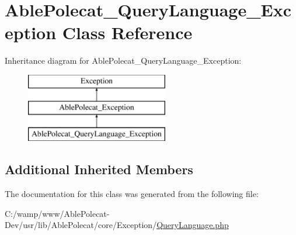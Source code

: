 \hypertarget{class_able_polecat___query_language___exception}{}\section{Able\+Polecat\+\_\+\+Query\+Language\+\_\+\+Exception Class Reference}
\label{class_able_polecat___query_language___exception}
Inheritance diagram for Able\+Polecat\+\_\+\+Query\+Language\+\_\+\+Exception\+:\begin{figure}[H]
\begin{center}
\leavevmode
\includegraphics[height=3.000000cm]{class_able_polecat___query_language___exception}
\end{center}
\end{figure}
\subsection*{Additional Inherited Members}


The documentation for this class was generated from the following file\+:\begin{DoxyCompactItemize}
\item 
C\+:/wamp/www/\+Able\+Polecat-\/\+Dev/usr/lib/\+Able\+Polecat/core/\+Exception/\hyperlink{_exception_2_query_language_8php}{Query\+Language.\+php}\end{DoxyCompactItemize}
